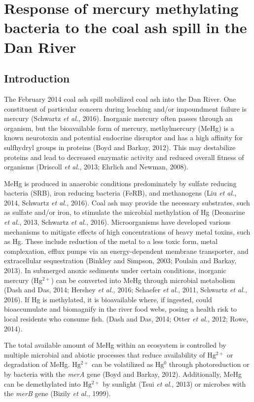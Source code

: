 \documentclass[ms, hidelinks]{uncgdissertationexp3}
\theoremstyle{plain}
\theoremstyle{definition}
\theoremstyle{remark}
\begin{document}
\chapter{Response of mercury methylating bacteria to the coal ash spill in the Dan River}
\section{Introduction}
The February 2014 coal ash spill mobilized coal ash into the Dan River. One constituent of particular concern during leaching and/or impoundment failure is mercury (Schwartz \emph{et al.}, 2016). Inorganic mercury often passes through an organism, but the bioavailable form of mercury, methylmercury (MeHg) is a known neurotoxin and potential endocrine disruptor and has a high affinity for sulfhydryl groups in proteins (Boyd and Barkay, 2012). This may destabilize proteins and lead to decreased enzymatic activity and reduced overall fitness of organisms (Driscoll \emph{et al.}, 2013; Ehrlich and Newman, 2008).

MeHg is produced in anaerobic conditions predominately by sulfate reducing bacteria (SRB), iron reducing bacteria (FeRB), and methanogens (Liu \emph{et al.}, 2014, Schwartz \emph{et al.}, 2016). Coal ash may provide the necessary substrates, such as sulfate and/or iron, to stimulate the microbial methylation of Hg (Deonarine \emph{et al.}, 2013, Schwartz \emph{et al.}, 2016). Microorganisms have developed various mechanisms to mitigate effects of high concentrations of heavy metal toxins, such as Hg. These include reduction of the metal to a less toxic form, metal complexation, efflux pumps via an energy-dependent membrane transporter, and extracellular sequestration (Binkley and Simpson, 2003; Poulain and Barkay, 2013).
In submerged anoxic sediments under certain conditions, inorganic mercury (\(\mathrm{Hg^{2+}}\)) can be converted into MeHg through microbial metabolism (Dash and Das, 2014; Hershey \emph{et al.}, 2016; Schaefer \emph{et al.}, 2011, Schwartz \emph{et al.}, 2016). If Hg is methylated, it is bioavailable where, if ingested, could bioaccumulate and biomagnify in the river food webs, posing a health risk to local residents who consume fish. (Dash and Das, 2014; Otter \emph{et al.}, 2012; Rowe, 2014).

The total available amount of MeHg within an ecosystem is controlled by multiple microbial and abiotic processes that reduce availability of \(\mathrm{Hg^{2+}}\) or degradation of MeHg. \(\mathrm{Hg^{2+}}\) can be volatilized as \(\mathrm{Hg^{0}}\) through photoreduction or by bacteria with the \emph{merA} gene (Boyd and Barkay, 2012). Additionally, MeHg can be demethylated into \(\mathrm{Hg^{2+}}\) by sunlight (Tsui \emph{et al.}, 2013) or microbes with the \emph{merB} gene (Bizily \emph{et al.}, 1999).
\end{document}
